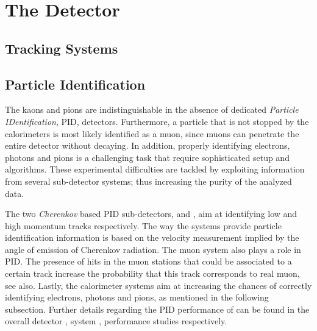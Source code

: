 
\chapter{The \lhcb Detector}
\label{lhcb_detector}


\section{Tracking Systems}
\label{det_tracking}


\section{Particle Identification}
\label{det_pid}

The kaons and pions are indistinguishable in the absence of dedicated {\it Particle IDentification}, PID, detectors.
Furthermore, a particle that is not stopped by the calorimeters is most likely identified as a muon,
since muons can penetrate the entire \lhcb detector without decaying. In addition, properly identifying
electrons, photons and pions is a challenging task that require sophisticated setup and algorithms.
These experimental difficulties are tackled by exploiting information from several sub-detector systems;
thus increasing the purity of the analyzed data.

The two {\it Cherenkov} based PID sub-detectors, \richone and \richtwo, aim at identifying low and
high momentum tracks respectively. The way the \rich systems provide particle identification information is
based on the velocity measurement implied by the angle of emission of Cherenkov radiation.
The muon system also plays a role in PID. The presence of hits in the muon stations that
could be associated to a certain track increase the probability that this track corresponds to real muon,
see  also. Lastly, the calorimeter systems aim at increasing the chances of correctly
identifying electrons, photons and pions, as mentioned in the following subsection.
Further details regarding the PID performance of \lhcb can be found in the overall detector \cite{Aaij:2014jba},
\rich system \cite{Adinolfi:1495721}, \muonID \cite{Archilli:1553139} performance studies respectively.

